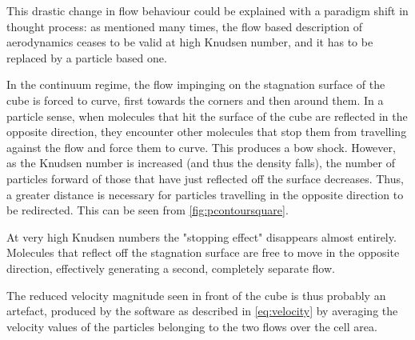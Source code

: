 This drastic change in flow behaviour could be explained with a paradigm shift in thought process: as mentioned many times, the flow based description of aerodynamics ceases to be valid at high Knudsen number, and it has to be replaced by a particle based one.

In the continuum regime, the flow impinging on the stagnation surface of the cube is forced to curve, first towards the corners and then around them. In a particle sense, when molecules that hit the surface of the cube are reflected in the opposite direction, they encounter other molecules that stop them from travelling against the flow and force them to curve. This produces a bow shock.
However, as the Knudsen number is increased (and thus the density falls), the number of particles forward of those that have just reflected off the surface decreases. Thus, a greater distance is necessary for particles travelling in the opposite direction to be redirected. This can be seen from \autoref{fig:pcontoursquare}.

At very high Knudsen numbers the "stopping effect" disappears almost entirely. Molecules that reflect off the stagnation surface are free to move in the opposite direction, effectively generating a second, completely separate flow.

The reduced velocity magnitude seen in front of the cube is thus probably an artefact, produced by the software as described in \autoref{eq:velocity} by averaging the velocity values of the particles belonging to the two flows over the cell area.

